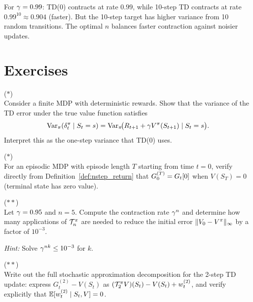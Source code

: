 \documentclass[11pt,a4paper]{article}
\begin{document}
\begin{example}
\label{ex:nstep_bias}
For $\gamma = 0.99$: TD(0) contracts at rate $0.99$, while 10-step
TD contracts at rate $0.99^{10} \approx 0.904$ (faster). But the
10-step target has higher variance from 10 random transitions. The
optimal $n$ balances faster contraction against noisier updates.
\end{example}

\section{Exercises}
\label{sec:exercises}

\begin{exercise}
\textnormal{(\(*\))} \\
Consider a finite MDP with deterministic rewards. Show that the variance
of the TD error under the true value function satisfies
\[
  \operatorname{Var}_\pi(\delta_t^\pi \mid S_t = s)
  = \operatorname{Var}_\pi\!\bigl(R_{t+1} + \gamma V^{\pi}(S_{t+1})
    \mid S_t = s\bigr).
\]
Interpret this as the one-step variance that TD(0) uses.
\end{exercise}

\begin{exercise}[MC as $n$-Step TD]
\textnormal{(\(*\))} \\
For an episodic MDP with episode length $T$ starting from time $t = 0$,
verify directly from Definition~\ref{def:nstep_return} that
$G_0^{(T)} = G_t[0]$ when $V(S_T) = 0$ (terminal state has zero
value).
\end{exercise}

\begin{exercise}
\textnormal{(\(**\))} \\
Let $\gamma = 0.95$ and $n = 5$. Compute the contraction rate
$\gamma^n$ and determine how many applications of $\mathcal{T}_n^\pi$
are needed to reduce the initial error $\|V_0 - V^{\pi}\|_\infty$ by a
factor of $10^{-3}$.

\textit{Hint:} Solve $\gamma^{nk} \leq 10^{-3}$ for $k$.
\end{exercise}

\begin{exercise}[Stochastic Approximation Decomposition for $n = 2$]
\textnormal{(\(**\))} \\
Write out the full stochastic approximation decomposition for the
2-step TD update: express $G_t^{(2)} - V(S_t)$ as
$(\mathcal{T}_2^\pi V)(S_t) - V(S_t) + w_t^{(2)}$, and verify
explicitly that $\mathbb{E}[w_t^{(2)} \mid S_t, V] = 0$.
\end{exercise}
\end{document}
